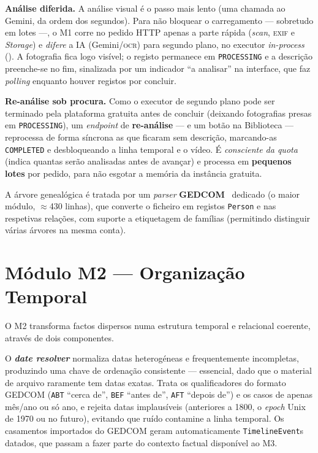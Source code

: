 \textbf{Análise diferida.} A análise visual é o passo mais lento (uma
chamada ao Gemini, da ordem dos segundos). Para não bloquear o carregamento
--- sobretudo em lotes ---, o M1 corre no pedido HTTP apenas a parte rápida
(\emph{scan}, \textsc{exif} e \emph{Storage}) e \emph{difere} a IA
(Gemini/\textsc{ocr}) para segundo plano, no executor \emph{in-process}
(). A fotografia fica logo visível; o registo
permanece em \texttt{PROCESSING} e a descrição preenche-se no fim,
sinalizada por um indicador ``a analisar'' na interface, que faz
\emph{polling} enquanto houver registos por concluir.

\textbf{Re-análise sob procura.} Como o executor de segundo plano pode ser
terminado pela plataforma gratuita antes de concluir (deixando fotografias
presas em \texttt{PROCESSING}), um \emph{endpoint} de \textbf{re-análise}
--- e um botão na Biblioteca --- reprocessa de forma síncrona as que ficaram
sem descrição, marcando-as \texttt{COMPLETED} e desbloqueando a linha
temporal e o vídeo. É \emph{consciente da quota} (indica quantas serão
analisadas antes de avançar) e processa em \textbf{pequenos lotes} por
pedido, para não esgotar a memória da instância gratuita.

A árvore genealógica é tratada por um \emph{parser} \textbf{GEDCOM}~\cite{gedcom}
dedicado (o maior módulo, $\approx$430 linhas), que converte o ficheiro em
registos \texttt{Person} e nas respetivas relações, com suporte a
etiquetagem de famílias (permitindo distinguir várias árvores na mesma
conta).

\section{Módulo M2 --- Organização Temporal}
\label{sec:impl_m2}

O M2 transforma factos dispersos numa estrutura temporal e relacional
coerente, através de dois componentes.

O \textbf{\emph{date resolver}} normaliza datas heterogéneas e
frequentemente incompletas, produzindo uma chave de ordenação consistente
— essencial, dado que o material de arquivo raramente tem datas exatas.
Trata os qualificadores do formato GEDCOM (\texttt{ABT} ``cerca de'',
\texttt{BEF} ``antes de'', \texttt{AFT} ``depois de'') e os casos de apenas
mês/ano ou só ano, e rejeita datas implausíveis (anteriores a 1800, o
\emph{epoch} Unix de 1970 ou no futuro), evitando que ruído contamine a
linha temporal. Os casamentos importados do GEDCOM geram automaticamente
\texttt{TimelineEvent}s datados, que passam a fazer parte do contexto
factual disponível ao M3.

